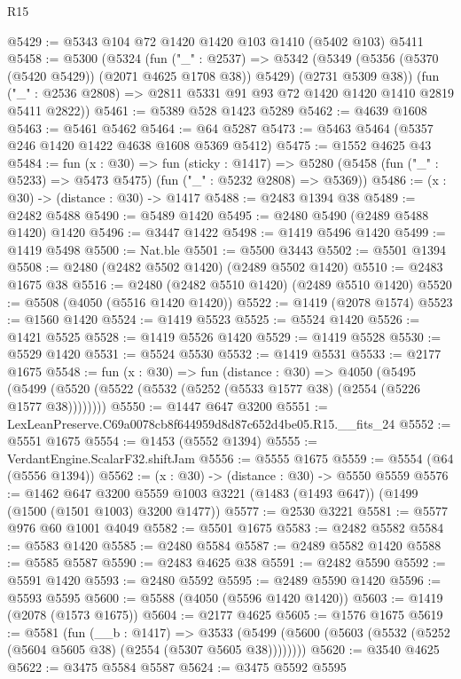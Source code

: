 \begin{lexlean}{R15}
\begin{coremodule}
@5429 := @5343 @104 @72 @1420 @1420 @103 @1410 (@5402 @103) @5411
@5458 := @5300
    (@5324
      (fun ("_" : @2537) =>
      @5342 (@5349 (@5356 (@5370 (@5420 @5429)) (@2071 @4625 @1708 @38)) @5429) (@2731 @5309 @38))
      (fun ("_" : @2536 @2808) => @2811 @5331 @91 @93 @72 @1420 @1420 @1410 @2819 @5411 @2822))
@5461 := @5389 @528 @1423 @5289
@5462 := @4639 @1608
@5463 := @5461 @5462
@5464 := @64 @5287
@5473 := @5463 @5464 (@5357 @246 @1420 @1422 @4638 @1608 @5369 @5412)
@5475 := @1552 @4625 @43
@5484 := fun (x : @30) =>
  fun (sticky : @1417) =>
  @5280 (@5458 (fun ("_" : @5233) => @5473 @5475) (fun ("_" : @5232 @2808) => @5369))
@5486 := (x : @30) -> (distance : @30) -> @1417
@5488 := @2483 @1394 @38
@5489 := @2482 @5488
@5490 := @5489 @1420
@5495 := @2480 @5490 (@2489 @5488 @1420) @1420
@5496 := @3447 @1422
@5498 := @1419 @5496 @1420
@5499 := @1419 @5498
@5500 := Nat.ble
@5501 := @5500 @3443
@5502 := @5501 @1394
@5508 := @2480 (@2482 @5502 @1420) (@2489 @5502 @1420)
@5510 := @2483 @1675 @38
@5516 := @2480 (@2482 @5510 @1420) (@2489 @5510 @1420)
@5520 := @5508 (@4050 (@5516 @1420 @1420))
@5522 := @1419 (@2078 @1574)
@5523 := @1560 @1420
@5524 := @1419 @5523
@5525 := @5524 @1420
@5526 := @1421 @5525
@5528 := @1419 @5526 @1420
@5529 := @1419 @5528
@5530 := @5529 @1420
@5531 := @5524 @5530
@5532 := @1419 @5531
@5533 := @2177 @1675
@5548 := fun (x : @30) =>
  fun (distance : @30) =>
  @4050 (@5495 (@5499 (@5520 (@5522 (@5532 (@5252 (@5533 @1577 @38) (@2554 (@5226 @1577 @38))))))))
@5550 := @1447 @647 @3200
@5551 := LexLeanPreserve.C69a0078cb8f644959d8d87c652d4be05.R15.__fits_24
@5552 := @5551 @1675
@5554 := @1453 (@5552 @1394)
@5555 := VerdantEngine.ScalarF32.shiftJam
@5556 := @5555 @1675
@5559 := @5554 (@64 (@5556 @1394))
@5562 := (x : @30) -> (distance : @30) -> @5550 @5559
@5576 := @1462
    @647
    @3200
    @5559
    @1003
    @3221
    (@1483 (@1493 @647))
    (@1499 (@1500 (@1501 @1003) @3200 @1477))
@5577 := @2530 @3221
@5581 := @5577 @976 @60 @1001 @4049
@5582 := @5501 @1675
@5583 := @2482 @5582
@5584 := @5583 @1420
@5585 := @2480 @5584
@5587 := @2489 @5582 @1420
@5588 := @5585 @5587
@5590 := @2483 @4625 @38
@5591 := @2482 @5590
@5592 := @5591 @1420
@5593 := @2480 @5592
@5595 := @2489 @5590 @1420
@5596 := @5593 @5595
@5600 := @5588 (@4050 (@5596 @1420 @1420))
@5603 := @1419 (@2078 (@1573 @1675))
@5604 := @2177 @4625
@5605 := @1576 @1675
@5619 := @5581
    (fun (__b : @1417) =>
    @3533 (@5499 (@5600 (@5603 (@5532 (@5252 (@5604 @5605 @38) (@2554 (@5307 @5605 @38))))))))
@5620 := @3540 @4625
@5622 := @3475 @5584 @5587
@5624 := @3475 @5592 @5595

\end{coremodule}
\end{lexlean}
